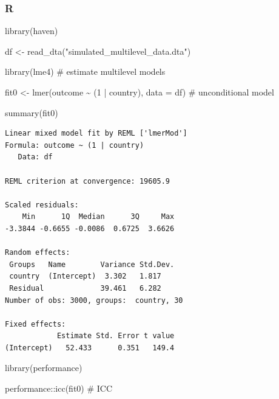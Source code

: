 \documentclass[
  letterpaper,
  DIV=11,
  numbers=noendperiod]{scrreprt}
\newenvironment{Shaded}{\begin{snugshade}}{\end{snugshade}}
\newcommand{\AttributeTok}[1]{\textcolor[rgb]{0.40,0.45,0.13}{#1}}
\newcommand{\CommentTok}[1]{\textcolor[rgb]{0.37,0.37,0.37}{#1}}
\newcommand{\DecValTok}[1]{\textcolor[rgb]{0.68,0.00,0.00}{#1}}
\newcommand{\FunctionTok}[1]{\textcolor[rgb]{0.28,0.35,0.67}{#1}}
\newcommand{\NormalTok}[1]{\textcolor[rgb]{0.00,0.23,0.31}{#1}}
\newcommand{\OtherTok}[1]{\textcolor[rgb]{0.00,0.23,0.31}{#1}}
\newcommand{\SpecialCharTok}[1]{\textcolor[rgb]{0.37,0.37,0.37}{#1}}
\newcommand{\StringTok}[1]{\textcolor[rgb]{0.13,0.47,0.30}{#1}}
\begin{document}
\subsubsection{R}

\begin{Shaded}
\begin{Highlighting}[]
\FunctionTok{library}\NormalTok{(haven)}

\NormalTok{df }\OtherTok{\textless{}{-}} \FunctionTok{read\_dta}\NormalTok{(}\StringTok{"simulated\_multilevel\_data.dta"}\NormalTok{)}
\end{Highlighting}
\end{Shaded}

\begin{Shaded}
\begin{Highlighting}[]
\FunctionTok{library}\NormalTok{(lme4) }\CommentTok{\# estimate multilevel models}

\NormalTok{fit0 }\OtherTok{\textless{}{-}} \FunctionTok{lmer}\NormalTok{(outcome }\SpecialCharTok{\textasciitilde{}}\NormalTok{ (}\DecValTok{1} \SpecialCharTok{|}\NormalTok{ country),}
             \AttributeTok{data =}\NormalTok{ df) }\CommentTok{\# unconditional model}

\FunctionTok{summary}\NormalTok{(fit0)}
\end{Highlighting}
\end{Shaded}

\begin{verbatim}
Linear mixed model fit by REML ['lmerMod']
Formula: outcome ~ (1 | country)
   Data: df

REML criterion at convergence: 19605.9

Scaled residuals: 
    Min      1Q  Median      3Q     Max 
-3.3844 -0.6655 -0.0086  0.6725  3.6626 

Random effects:
 Groups   Name        Variance Std.Dev.
 country  (Intercept)  3.302   1.817   
 Residual             39.461   6.282   
Number of obs: 3000, groups:  country, 30

Fixed effects:
            Estimate Std. Error t value
(Intercept)   52.433      0.351   149.4
\end{verbatim}

\begin{Shaded}
\begin{Highlighting}[]
\FunctionTok{library}\NormalTok{(performance)}

\NormalTok{performance}\SpecialCharTok{::}\FunctionTok{icc}\NormalTok{(fit0) }\CommentTok{\# ICC}
\end{Highlighting}
\end{Shaded}
\end{document}
